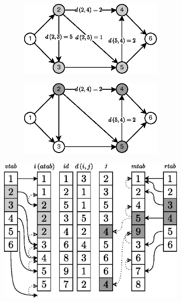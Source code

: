 \begin{figure}[!htbp]
	\centering
	\begin{subfigure}[b]{0.32\textwidth}
		\begin{subfigure}[b]{1\textwidth}
			\includegraphics[width=\textwidth]{Chapter_I/5/1_5a.eps}
			\caption{}
		\end{subfigure}
		\begin{subfigure}[b]{1\textwidth}
			\includegraphics[width=\textwidth]{Chapter_I/5/1_5b.eps}
			\caption{}
		\end{subfigure}
	\end{subfigure}
	\qquad
	\begin{subfigure}[b]{0.50\textwidth}
		\includegraphics[width=\textwidth]{Chapter_I/5/1_5c.eps}

\end{subfigure}
\end{figure}
